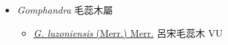 
  \begin{itemize}
 \item[] \textit{Gomphandra} 毛蕊木屬
                    
  \begin{itemize}
        \item[] \href{http://www.theplantlist.org/tpl1.1/search?q=Gomphandra+luzoniensis}{\textit{G. luzoniensis} (Merr.) Merr.}   呂宋毛蕊木 VU
  \end{itemize}
  \end{itemize}
